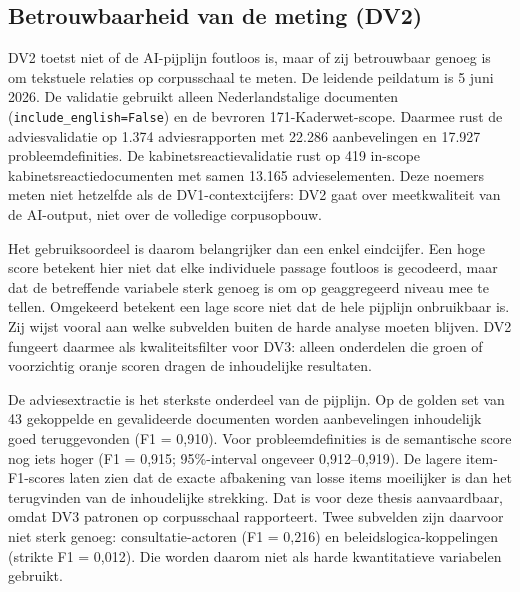 
\subsection{Betrouwbaarheid van de meting (DV2)}
\label{subsec:dv2-betrouwbaarheid-compact}

\noindent DV2 toetst niet of de AI-pijplijn foutloos is, maar of zij betrouwbaar
genoeg is om tekstuele relaties op corpusschaal te meten. De leidende peildatum is
5 juni 2026. De validatie gebruikt alleen Nederlandstalige documenten
(\texttt{include\_english=False}) en de bevroren 171-Kaderwet-scope. Daarmee rust
de adviesvalidatie op 1.374 adviesrapporten met 22.286 aanbevelingen en 17.927
probleemdefinities. De kabinetsreactievalidatie rust op 419 in-scope
kabinetsreactiedocumenten met samen 13.165 advieselementen. Deze noemers meten
niet hetzelfde als de DV1-contextcijfers: DV2 gaat over meetkwaliteit van de
AI-output, niet over de volledige corpusopbouw.

\noindent Het gebruiksoordeel is daarom belangrijker dan een enkel eindcijfer.
Een hoge score betekent hier niet dat elke individuele passage foutloos is
gecodeerd, maar dat de betreffende variabele sterk genoeg is om op geaggregeerd
niveau mee te tellen. Omgekeerd betekent een lage score niet dat de hele pijplijn
onbruikbaar is. Zij wijst vooral aan welke subvelden buiten de harde analyse
moeten blijven. DV2 fungeert daarmee als kwaliteitsfilter voor DV3: alleen
onderdelen die groen of voorzichtig oranje scoren dragen de inhoudelijke
resultaten.

\noindent De adviesextractie is het sterkste onderdeel van de pijplijn. Op de
golden set van 43 gekoppelde en gevalideerde documenten worden aanbevelingen
inhoudelijk goed teruggevonden (F1 = 0,910). Voor probleemdefinities is de
semantische score nog iets hoger (F1 = 0,915; 95\%-interval ongeveer
0,912--0,919). De lagere item-F1-scores laten zien dat de exacte afbakening van
losse items moeilijker is dan het terugvinden van de inhoudelijke strekking. Dat
is voor deze thesis aanvaardbaar, omdat DV3 patronen op corpusschaal rapporteert.
Twee subvelden zijn daarvoor niet sterk genoeg: consultatie-actoren (F1 = 0,216)
en beleidslogica-koppelingen (strikte F1 = 0,012). Die worden daarom niet als
harde kwantitatieve variabelen gebruikt.

